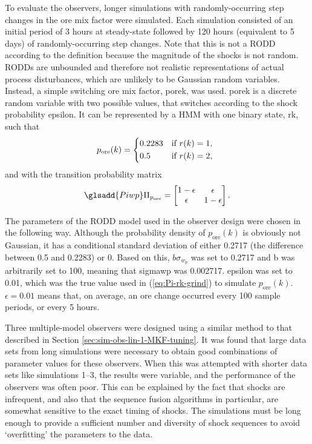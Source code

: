 To evaluate the observers, longer simulations with randomly-occurring step changes in the ore mix factor were simulated. Each simulation consisted of an initial period of 3 hours at steady-state followed by 120 hours (equivalent to 5 days) of randomly-occurring step changes. Note that this is not a RODD according to the definition because the magnitude of the shocks is not random. RODDs are unbounded and therefore not realistic representations of actual process disturbances, which are unlikely to be Gaussian random variables. Instead, a simple switching ore mix factor, \gls{porek}, was used. \gls{porek} is a discrete random variable with two possible values, that switches according to the shock probability \gls{epsilon}. It can be represented by a \gls{HMM} with one binary state, \gls{rk}, such that
\begin{equation} \label{eq:pk-grind}
	p_\text{ore}(k) = \begin{cases*}
		0.2283 & if $r(k)=1$, \\
		0.5 & if $r(k)=2$,
	\end{cases*} \\
\end{equation}
and with the transition probability matrix
\begin{equation} \label{eq:Pi-rk-grind}
	\glsadd{Piwp}\Pi_{p_\text{ore}} = \begin{bmatrix}
		1-\epsilon & \epsilon \\
		\epsilon & 1-\epsilon
	\end{bmatrix}.
\end{equation}

The parameters of the RODD model used in the observer design were chosen in the following way. Although the probability density of $p_\text{ore}(k)$ is obviously not Gaussian, it has a conditional standard deviation of either 0.2717 (the difference between 0.5 and 0.2283) or 0. Based on this, $b\sigma_{w_p}$ was set to 0.2717 and \gls{b} was arbitrarily set to 100, meaning that \gls{sigmawp} was 0.002717. \gls{epsilon} was set to 0.01, which was the true value used in (\ref{eq:Pi-rk-grind}) to simulate $p_\text{ore}(k)$. $\epsilon=0.01$ means that, on average, an ore change occurred every 100 sample periods, or every 5 hours.

Three multiple-model observers were designed using a similar method to that described in Section \ref{sec:sim-obs-lin-1-MKF-tuning}. It was found that large data sets from long simulations were necessary to obtain good combinations of parameter values for these observers. When this was attempted with shorter data sets like simulations 1--3, the results were variable, and the performance of the observers was often poor. This can be explained by the fact that shocks are infrequent, and also that the sequence fusion algorithms in particular, are somewhat sensitive to the exact timing of shocks. The simulations must be long enough to provide a sufficient number and diversity of shock sequences to avoid `overfitting' the parameters to the data.

